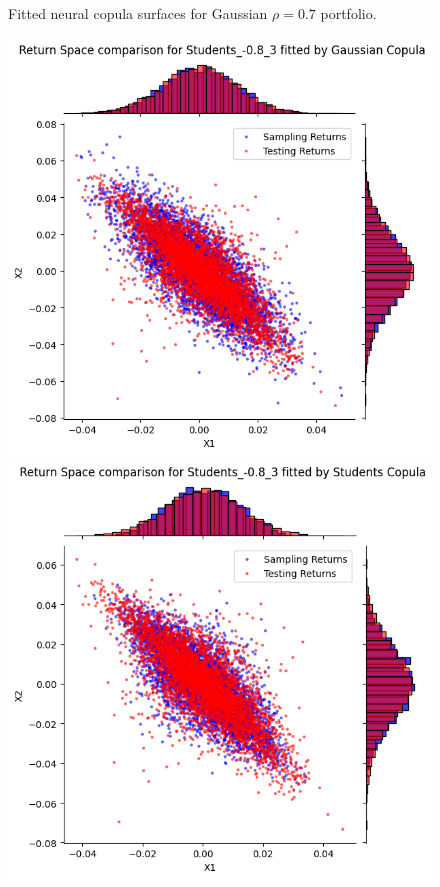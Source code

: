 \documentclass[%
a4paper,							
11pt,								
bibliography=totoc,						
abstracton=true					
]
{scrartcl}
\theoremstyle{plain}
\theoremstyle{definition}
\theoremstyle{remark}
\newcommand{\1}{\mathbbm{1}}
\begin{document}
\begin{figure}[H]
\begin{minipage}{0.4\textwidth}
    \end{minipage}
    \caption{Fitted neural copula surfaces for Gaussian $\rho=0.7$ portfolio.}
    \label{fig:GeneratedDataGaussian07}
\end{figure}
\begin{figure}[H]
    \centering
    \begin{minipage}{0.4\textwidth}
        \centering
        \includegraphics[width=\textwidth]{5ResultsDiscussion/pictures/PortfolioTest/ResultPortfolio3Gauss.png}
    \end{minipage}
    \hfill
    \begin{minipage}{0.4\textwidth}
        \centering
        \includegraphics[width=\textwidth]{5ResultsDiscussion/pictures/PortfolioTest/ResultPortfolio3Students.png}

\end{minipage}
\end{figure}
\end{document}
